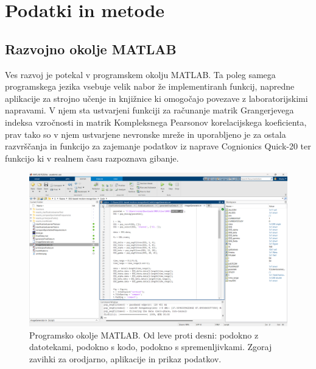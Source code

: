 \chapter{Podatki in metode}
\section{Razvojno okolje MATLAB}
Ves razvoj je potekal v programskem okolju MATLAB. Ta poleg samega programskega jezika vsebuje velik nabor že implementiranh funkcij, napredne aplikacije za strojno učenje in knjižnice ki omogočajo povezave z laboratorijskimi napravami. V njem sta ustvarjeni funkciji za računanje matrik Grangerjevega indeksa vzročnosti
in matrik Kompleksnega Pearsonov korelacijskega koeficienta, prav tako so v njem ustvarjene nevronske mreže in uporabljeno je za ostala razvrščanja in funkcijo za zajemanje podatkov iz naprave Cognionics Quick-20 ter funkcijo ki v realnem času razpoznava gibanje. \cite{MATLAB}
\begin{figure}[h!]
    \begin{center}
    \includegraphics[width=1\linewidth]{slike/Matlab.png}
    \end{center}
    \caption[Programsko okolje MATLAB.]{Programsko okolje MATLAB. Od leve proti desni: podokno z datotekami, podokno s kodo, podokno s spremenljivkami. Zgoraj zavihki za orodjarno, aplikacije in prikaz podatkov.}
    \end{figure}
    
